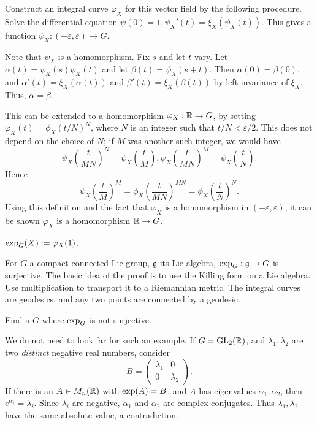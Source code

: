 Construct an integral curve  $\varphi_X$ for this vector field by the following 
procedure. Solve the  differential equation
$\psi(0) = 1, \psi_X'(t)
= \xi_X(\psi_X(t))$. This gives a 
function $\psi_X : (-\varepsilon, \varepsilon) \rightarrow G$.

Note that $\psi_X$ is a homomorphism. Fix $s$ and let $t$ vary. Let
$\alpha(t) = \psi_X(s) \psi_X(t)$ and let $\beta(t) = \psi_X(s + t)$. Then
$\alpha(0) = \beta(0)$, and $\alpha'(t) = \xi_X(\alpha(t))$ and
$\beta'(t) = \xi_X(\beta(t))$ by left-invariance of $\xi_X$. Thus,
$\alpha = \beta$.

This can be extended to a homomorphism $\varphi_X : \mathbb{R} \rightarrow G$,
by setting $\varphi_X(t) = \phi_X(t/N)^N$, where $N$ is an integer such that
$t/N < \varepsilon/2$. This does not depend on the choice of $N$; if $M$ was
another such integer, we would have
\[ \psi_X\left(\dfrac{t}{MN}\right)^N = \psi_X\left(\dfrac{t}{M}\right), 
  \psi_X\left(\dfrac{t}{MN}\right)^M = \psi_X\left(\dfrac{t}{N}\right). \]
Hence \[ \psi_X\left(\dfrac{t}{M}\right)^M = \phi_X(\dfrac{t}{MN})^{MN}
 = \phi_X\left(\dfrac{t}{N}\right)^N. \]
Using this definition and the fact that $\varphi_X$ is a homomorphism in
$(-\varepsilon, \varepsilon)$, it can be shown $\varphi_X$ is a homomorphism
$\mathbb{R} \rightarrow G$.

\begin{defn}
$\operatorname{exp}_G(X) := \varphi_X(1)$.
\end{defn}

\begin{rmk}
For $G$ a compact connected Lie group, $\mathfrak{g}$ its Lie algebra,
$\operatorname{exp}_G: \mathfrak{g} \rightarrow G$ is surjective. The basic idea of the
proof is to use the Killing form on a Lie algebra. Use multiplication to 
transport it to a Riemannian metric. The integral curves are geodesics, and any
two points are connected by a geodesic.
\end{rmk}

\begin{ex}
Find a $G$ where $\operatorname{exp}_G$ is not surjective.

We do not need to look far for such an example. If $G = \mathrm{GL}_{2}({\mathbb{R}})$, and
$\lambda_1, \lambda_2$ are two \emph{distinct} negative real numbers, consider
\[B = \left(\begin{matrix}
  \lambda_1 & 0 \\
  0 & \lambda_2
\end{matrix}\right). \]
If there is an $A \in M_n(\mathbb{R})$ with $\operatorname{exp}(A) = B$, and $A$ has
eigenvalues $\alpha_1, \alpha_2$, then $e^{\alpha_i} = \lambda_i$. Since
$\lambda_i$ are negative, $\alpha_1$ and $\alpha_2$ are complex conjugates. Thus
$\lambda_1, \lambda_2$ have the same absolute value, a contradiction.
\end{ex}

